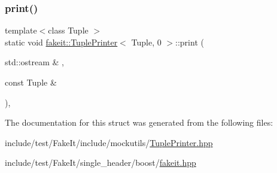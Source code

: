 \mbox{\label{structfakeit_1_1TuplePrinter_3_01Tuple_00_010_01_4_a7ca7f3fd3db9f8f91171e29abbdce335}} 
\subsubsection{\texorpdfstring{print()}{print()}\hspace{0.1cm}{\footnotesize\ttfamily [9/9]}}
{\footnotesize\ttfamily template$<$class Tuple $>$ \\
static void \mbox{\hyperlink{structfakeit_1_1TuplePrinter}{fakeit\+::\+Tuple\+Printer}}$<$ Tuple, 0 $>$\+::print (\begin{DoxyParamCaption}\item[{std\+::ostream \&}]{,  }\item[{const Tuple \&}]{ }\end{DoxyParamCaption})\hspace{0.3cm}{\ttfamily [inline]}, {\ttfamily [static]}}



The documentation for this struct was generated from the following files\+:\begin{DoxyCompactItemize}
\item 
include/test/\+Fake\+It/include/mockutils/\mbox{\hyperlink{TuplePrinter_8hpp}{Tuple\+Printer.\+hpp}}\item 
include/test/\+Fake\+It/single\+\_\+header/boost/\mbox{\hyperlink{single__header_2boost_2fakeit_8hpp}{fakeit.\+hpp}}\end{DoxyCompactItemize}
